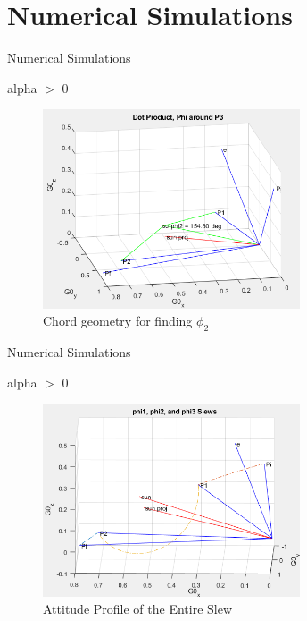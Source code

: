 \documentclass{beamer}
\begin{document}
\section{Numerical Simulations}
\begin{frame}{Numerical Simulations}
	\begin{block}{alpha $>$ 0}
		\begin{figure}
			\label{fig:phi2_geometry}
			\includegraphics[width=3in]{figures/alphaNot0/chord_geometry_phi2.png}
			\caption{Chord geometry for finding $\phi_2$}
		\end{figure}

	\end{block}
	
	
\end{frame}
\begin{frame}{Numerical Simulations}
	\begin{block}{alpha $>$ 0}
		\begin{figure}[H]
			\label{fig:phi1_phi2_phi3}
			\includegraphics[width=3in]{figures/alphaNot0/phi1_phi2_phi3.png}
			\caption{Attitude Profile of the Entire Slew}
		\end{figure}
	\end{block}
\end{frame}
\end{document}
